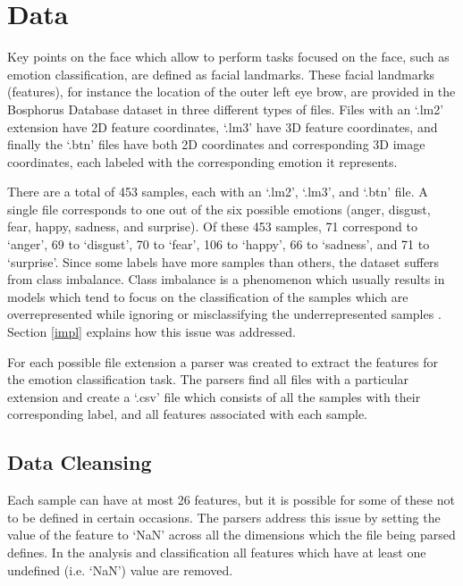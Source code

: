 \section{Data}

Key points on the face which allow to perform tasks focused on the face, such as emotion classification, are defined as facial landmarks. These facial landmarks (features), for instance the location of the outer left eye brow, are provided in the Bosphorus Database dataset in three different types of files. Files with an `.lm2' extension have 2D feature coordinates, `.lm3' have 3D feature coordinates, and finally the `.btn' files have both 2D coordinates and corresponding 3D image coordinates, each labeled with the corresponding emotion it represents.

There are a total of 453 samples, each with an `.lm2', `.lm3', and `.btn' file. A single file corresponds to one out of the six possible emotions (anger, disgust, fear, happy, sadness, and surprise). Of these 453 samples, 71 correspond to `anger', 69 to `disgust', 70 to `fear', 106 to `happy', 66 to `sadness', and 71 to `surprise'. Since some labels have more samples than others, the dataset suffers from class imbalance. Class imbalance is a phenomenon which usually results in models which tend to focus on the classification of the samples which are overrepresented while ignoring or misclassifying the underrepresented samples \cite{data-mining-intro}. Section \ref{impl} explains how this issue was addressed.

For each possible file extension a parser was created to extract the features for the emotion classification task. The parsers find all files with a particular extension and create a `.csv' file which consists of all the samples with their corresponding label, and all features associated with each sample.

\subsection{Data Cleansing}

Each sample can have at most 26 features, but it is possible for some of these not to be defined in certain occasions. The parsers address this issue by setting the value of the feature to `NaN' across all the dimensions which the file being parsed defines. In the analysis and classification all features which have at least one undefined (i.e. `NaN') value are removed.

